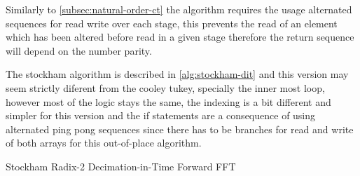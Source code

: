 \documentclass[
  oneside,
  11pt, a4paper,
  footinclude=true,
  headinclude=true,
  cleardoublepage=empty
]{scrbook}
\begin{document}
Similarly to \autoref{subsec:natural-order-ct} the algorithm requires the usage alternated sequences for read write over each stage, this prevents the read of an element which has been altered before read in a given stage therefore the return sequence will depend on the  number parity.

The stockham algorithm is described in \autoref{alg:stockham-dit} and this version may seem strictly diferent from the cooley tukey, specially the inner most loop, however most of the logic stays the same, the indexing is a bit different and simpler for this version and the if statements are a consequence of using alternated ping pong sequences since there has to be branches for read and write of both arrays for this out-of-place algorithm.



\begin{algorithm}[H]
    \caption{Stockham Radix-2 Decimation-in-Time Forward FFT} \label{alg:stockham-dit}

\end{algorithm}
\end{document}
